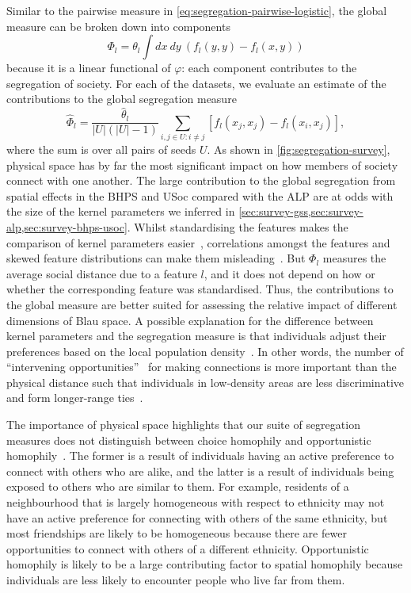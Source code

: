 \documentclass{scrartcl}
\newcommand{\card}[1]{\left|#1\right|}
\newcommand{\seeds}{U}
\begin{document}
Similar to the pairwise measure in \cref{eq:segregation-pairwise-logistic}, the global measure can be broken down into components
\[
    \Phi_l = \theta_l \int dx\ dy\ \left(f_l(y, y) - f_l(x, y)\right)
\]
because it is a linear functional of $\varphi$: each component contributes to the segregation of society. For each of the datasets, we evaluate an estimate of the contributions to the global segregation measure
\[
    \hat\Phi_l = \frac{\hat\theta_l}{\card{\seeds}(\card{\seeds}-1)} \sum_{i, j\in\seeds:i\neq j} \left[f_l(x_j, x_j)-f_l(x_i, x_j)\right],
\]
where the sum is over all pairs of seeds $\seeds$. As shown in \cref{fig:segregation-survey}, physical space has by far the most significant impact on how members of society connect with one another. The large contribution to the global segregation from spatial effects in the BHPS and USoc compared with the ALP are at odds with the size of the kernel parameters we inferred in \cref{sec:survey-gss,sec:survey-alp,sec:survey-bhps-usoc}. Whilst standardising the features makes the comparison of kernel parameters easier~\cite{Gelman2008a}, correlations amongst the features and skewed feature distributions can make them misleading~\cite{Greenland1986}. But $\Phi_l$ measures the average social distance due to a feature $l$, and it does not depend on how or whether the corresponding feature was standardised. Thus, the contributions to the global measure are better suited for assessing the relative impact of different dimensions of Blau space. A possible explanation for the difference between kernel parameters and the segregation measure is that individuals adjust their preferences based on the local population density~\cite{Backstrom2010}. In other words, the number of ``intervening opportunities''~\cite{Stouffer1940,Illenberger2013} for making connections is more important than the physical distance such that individuals in low-density areas are less discriminative and form longer-range ties~\cite{Liben-Nowell2005}.

The importance of physical space highlights that our suite of segregation measures does not distinguish between choice homophily and opportunistic homophily~\cite{Franz2010}. The former is a result of individuals having an active preference to connect with others who are alike, and the latter is a result of individuals being exposed to others who are similar to them. For example, residents of a neighbourhood that is largely homogeneous with respect to ethnicity may not have an active preference for connecting with others of the same ethnicity, but most friendships are likely to be homogeneous because there are fewer opportunities to connect with others of a different ethnicity. Opportunistic homophily is likely to be a large contributing factor to spatial homophily because individuals are less likely to encounter people who live far from them.
\end{document}
